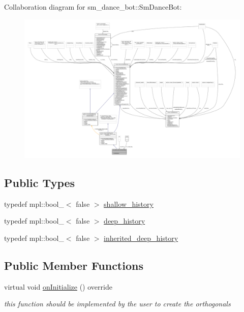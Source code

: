 Collaboration diagram for sm\+\_\+dance\+\_\+bot\+:\+:Sm\+Dance\+Bot\+:
\nopagebreak
\begin{figure}[H]
\begin{center}
\leavevmode
\includegraphics[width=350pt]{structsm__dance__bot_1_1SmDanceBot__coll__graph}
\end{center}
\end{figure}
\subsection*{Public Types}
\begin{DoxyCompactItemize}
\item 
typedef mpl\+::bool\+\_\+$<$ false $>$ \hyperlink{structsm__dance__bot_1_1SmDanceBot_a780b2408077887cc9c888ed0a95bff68}{shallow\+\_\+history}
\item 
typedef mpl\+::bool\+\_\+$<$ false $>$ \hyperlink{structsm__dance__bot_1_1SmDanceBot_abd58ec4a2b50a45da304a5f0b9c44706}{deep\+\_\+history}
\item 
typedef mpl\+::bool\+\_\+$<$ false $>$ \hyperlink{structsm__dance__bot_1_1SmDanceBot_a9bc29171f1a5e3cfd09824a06f6a8058}{inherited\+\_\+deep\+\_\+history}
\end{DoxyCompactItemize}
\subsection*{Public Member Functions}
\begin{DoxyCompactItemize}
\item 
virtual void \hyperlink{structsm__dance__bot_1_1SmDanceBot_a1baf6710e3e4755483e1e8441bb0f910}{on\+Initialize} () override
\begin{DoxyCompactList}\small\item\em this function should be implemented by the user to create the orthogonals \end{DoxyCompactList}\end{DoxyCompactItemize}
